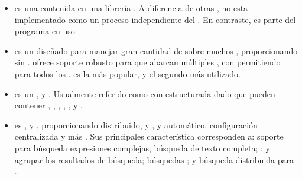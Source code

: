 \begin{itemize}
	\item \textbf{\sqlite} es una \rdbms contenida en una librería \cprogramming. A diferencia de otras \dbmangesystem, \sqlite no esta implementado como un proceso independiente del \clientAS. En contraste, es parte del programa en uso \cite{online_video_introduction_sqlite}.
	
	\item \textbf{\cassandraNAME} es un \nosqlNAME \wideColumnDB \store \openSourcePC diseñado para manejar gran cantidad de \dataPC sobre muchos \commodityServerPC, proporcionando \highAvailabilityDB sin \singlePointFailurePC. \cassandraNAME ofrece soporte robusto para \clustersAS que abarcan múltiples \dataCentersPC \cite{online_cassandra_multi_def}, con \masterlessDB \asynRepDB permitiendo \lowLatencyOperationsINT para todos los \clientsAS.
	\cassandraNAME es la \wideColumnDB \store más popular, y el segundo \nosqlNAME más utilizado\cite{online_db_engines_ranking}.
	
	\item \textbf{\redisNAME} es un \nosqlNAME \openSourcePC, \keyValueDB \cachePC y \store. Usualmente referido como \serverAS con \dataPC estructurada dado que \keysDB pueden contener \stringsPL, \hashesPL, \listsPL, \setsPL, \sortedPL, \bitmapsPL y \hyperloglogsPL \cite{online_redis_website}.

	\item \textbf{\solrNAME} es \highly \reliableQA, \scalableQA y \faultTolerantQA, proporcionando \indexingDB distribuido, \replicationDB y \queryingDB \loadBalancedDB, \failoverPC y \recoveryDB automático, configuración centralizada y más \cite{online_official_website_solrn}. Sus principales característica corresponden a: soporte para búsqueda expresiones complejas, búsqueda de texto completa; \stemmingDB; \rankingCPT y agrupar los resultados de búsqueda; búsquedas \geoSpatialCPT; y búsqueda distribuida para \highScalabilityDB \cite{online_dbengines_solr_info}.
	
\end{itemize}

